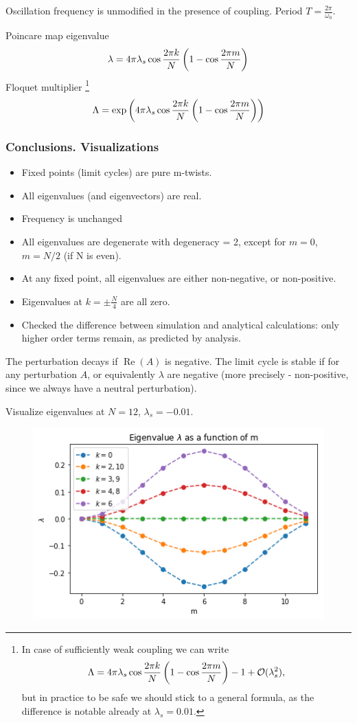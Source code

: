 \documentclass[a4paper,12pt]{article}
\renewcommand*{\Re}{\operatorname{Re}}
\newcommand*{\bigO}{\mathcal{O}}
\begin{document}
Oscillation frequency is unmodified in the presence of coupling. Period $T = \frac{2 \pi}{\omega_0}$.


Poincare map eigenvalue
$$
\lambda = 4 \pi \lambda_s  \cos \frac{2 \pi k} {N}  \left(1 - \cos \frac{2 \pi m} {N}  \right)
$$
Floquet multiplier 
\footnote{
In case of sufficiently weak coupling we can write
$$
\Lambda 
= 4 \pi \lambda_s  \co{k}{} \left(1 - \co{m}{} \right) - 1  + \bigO(\lambda_s^2),
$$
but in practice to be safe we should stick to a general formula, as the difference is notable already at $\lambda_s = 0.01$.
}
$$
\Lambda = \exp \left( 4  \pi \lambda_s  \cos \frac{2 \pi k} {N}  \left(1 - \cos \frac{2 \pi m} {N}  \right) \right)
$$



\subsubsection{Conclusions. Visualizations}
\begin{itemize}
\item Fixed points (limit cycles) are pure m-twists.
\item All eigenvalues (and eigenvectors) are real.
\item Frequency is unchanged
\item All eigenvalues are degenerate with degeneracy = 2, except for $m=0$, $m=N / 2$ (if N is even).
\item At any fixed point, all eigenvalues are either non-negative, or non-positive.
\item Eigenvalues at $k=\pm\frac{N}{4}$  are all zero.
\item Checked the difference between simulation and analytical calculations: only higher order terms remain, as predicted by analysis.

\end{itemize}

The perturbation decays if $\Re(A)$ is negative. The limit cycle is stable if for any perturbation $A$, or equivalently $\lambda$ are negative (more precisely - non-positive, since we always have a neutral perturbation).


Visualize eigenvalues at $N=12$, $\lambda_s = - 0.01$. 


\begin{figure}[h]
    \centering
    \includegraphics[width=.6\textwidth]{assets/theory-2019-08-27-181128169-abc.png}
\end{figure}
\end{document}
